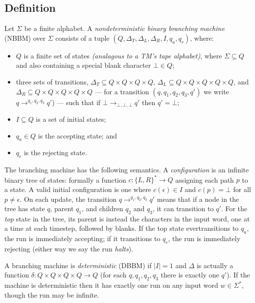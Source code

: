 \documentclass{article}
\theoremstyle{definition}
\begin{document}
\subsection{Definition}

Let $\Sigma$ be a finite alphabet.
A \emph{nondeterministic binary branching machine} (NBBM)
over $\Sigma$ consists of a tuple $(Q, \Delta_T, \Delta_L, \Delta_R, I, q_a, q_r)$, where:
\begin{itemize}
\item $Q$ is a finite set of states \emph{(analagous to a TM's tape alphabet)}, where $\Sigma \subseteq Q$ and also containing a special blank character $\bot \in Q$;
\item three sets of transitions, $\Delta_T \subseteq Q \times Q \times Q \times Q$, $\Delta_L \subseteq Q \times Q \times Q \times Q \times Q$, and $\Delta_R \subseteq Q \times Q \times Q \times Q \times Q$ ---
for a transition $(q, q_1, q_2, q_3, q')$ we write
$q \to^{q_1, q_2, q_3} q'$) ---
such that if $\bot \to_{\bot, \bot, \bot} q'$ then $q' = \bot$;
\item $I \subseteq Q$ is a set of initial states;
\item $q_a \in Q$ is the accepting state; and
\item $q_r$ is the rejecting state.
\end{itemize}

The branching machine has the following semantics.
A \emph{configuration} is an infinite binary tree of states:
formally a function $c: \{L, R\}^* \to Q$ assigning each path $p$ to a state.
A valid initial configuration is one where $c(\epsilon) \in I$ and $c(p) = \bot$ for all $p \ne \epsilon$.
On each update, the transition $q \to^{q_1, q_2, q_3} q'$ means that if a node in the tree has state $q$, parent $q_1$, and children $q_2$ and $q_3$, it can transition to $q'$. For the \emph{top} state in the tree, its parent is instead the characters in the input word, one at a time at each timestep, followed by blanks.
If the top state evertransitions to $q_a$, the run is immediately accepting; if it transitions to $q_r$, the run is immediately rejecting (either way we say the run \emph{halts}).

A branching machine is \emph{deterministic} (DBBM) if $|I| = 1$ and $\Delta$ is actually a function $\delta: Q \times Q \times Q \times Q \to Q$ (for each $q, q_1, q_2, q_3$ there is exactly one $q'$).
If the machine is deterministic then it has exactly one run on any input word $w \in \Sigma^*$, though the run may be infinite.
\end{document}
